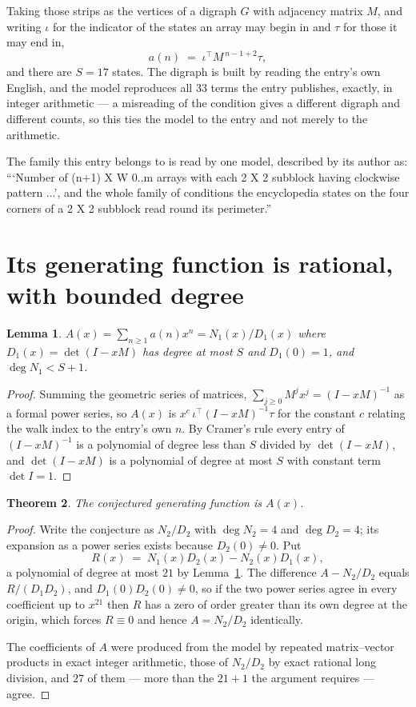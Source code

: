 \documentclass[11pt,a4paper]{article}
\theoremstyle{plain}
\newtheorem{theorem}{Theorem}
\newtheorem{lemma}[theorem]{Lemma}
\theoremstyle{definition}
\begin{document}
Taking those strips as the vertices of a digraph $G$ with adjacency matrix $M$, and writing
$\iota$ for the indicator of the states an array may begin in and $\tau$ for those it may end
in,
\[
a(n)\;=\;\iota^{\!\top}M^{\,n-1+2}\tau ,
\]
and there are $S=17$ states. The digraph is built by reading the entry's own English, and the
model reproduces all $33$ terms the entry publishes, exactly, in integer arithmetic --- a
misreading of the condition gives a different digraph and different counts, so this ties the
model to the entry and not merely to the arithmetic.

The family this entry belongs to is read by one model, described by its author as: ```Number of (n+1) X W 0..m arrays with each 2 X 2 subblock having clockwise pattern ...', and the whole family of conditions the encyclopedia states on the four corners of a 2 X 2 subblock read round its perimeter.''


\section{Its generating function is rational, with bounded degree}

\begin{lemma}\label{lem:rat}
$A(x)=\sum_{n\ge1}a(n)x^n=N_1(x)/D_1(x)$ where $D_1(x)=\det(I-xM)$ has degree at most
$S$ and $D_1(0)=1$, and $\deg N_1<S+1$.
\end{lemma}

\begin{proof}
Summing the geometric series of matrices, $\sum_{j\ge0}M^jx^j=(I-xM)^{-1}$ as a formal
power series, so $A(x)$ is $x^{c}\,\iota^{\!\top}(I-xM)^{-1}\tau$ for the constant $c$
relating the walk index to the entry's own $n$. By Cramer's rule every entry of
$(I-xM)^{-1}$ is a polynomial of degree less than $S$ divided by $\det(I-xM)$, and
$\det(I-xM)$ is a polynomial of degree at most $S$ with constant term $\det I=1$.
\end{proof}

\begin{theorem}
The conjectured generating function is $A(x)$.
\end{theorem}

\begin{proof}
Write the conjecture as $N_2/D_2$ with $\deg N_2=4$ and $\deg D_2=4$; its expansion as a
power series exists because $D_2(0)\neq0$. Put
\[
R(x)\;=\;N_1(x)D_2(x)-N_2(x)D_1(x),
\]
a polynomial of degree at most $21$ by Lemma~\ref{lem:rat}. The difference
$A-N_2/D_2$ equals $R/(D_1D_2)$, and $D_1(0)D_2(0)\neq0$, so if the two power series agree in
every coefficient up to $x^{21}$ then $R$ has a zero of order greater than its own
degree at the origin, which forces $R\equiv0$ and hence $A=N_2/D_2$ identically.

The coefficients of $A$ were produced from the model by repeated matrix--vector products in
exact integer arithmetic, those of $N_2/D_2$ by exact rational long division, and $27$
of them --- more than the $21+1$ the argument requires --- agree.
\end{proof}
\end{document}
